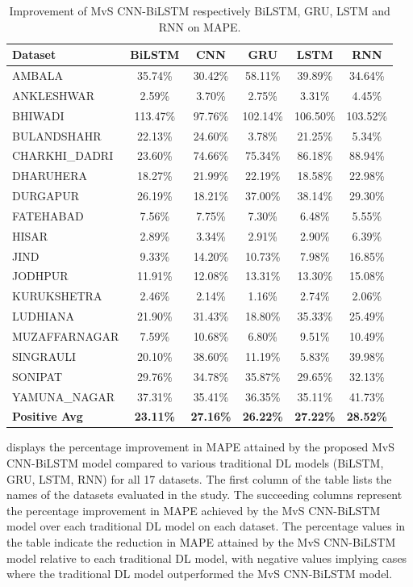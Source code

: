 \documentclass[a4paper, fleqn]{cas-sc}
\theoremstyle{definition}
\theoremstyle{remark}
\begin{document}
  \begin{table}[]
    \caption{ Improvement of MvS CNN-BiLSTM respectively BiLSTM,  GRU,  LSTM and RNN on MAPE.}
    \label{MAPE imp}
    \begin{tabular}{lccccc}
    \hline   Dataset       &   BiLSTM &CNN & GRU &   LSTM &   RNN  \\ \hline
    AMBALA & 35.74\% & 30.42\% & 58.11\% & 39.89\% & 34.64\% \\
    ANKLESHWAR & 2.59\% & 3.70\% & 2.75\% & 3.31\% & 4.45\% \\
    BHIWADI & 113.47\% & 97.76\% & 102.14\% & 106.50\% & 103.52\% \\
    BULANDSHAHR & 22.13\% & 24.60\% & 3.78\% & 21.25\% & 5.34\% \\
    CHARKHI\_DADRI & 23.60\% & 74.66\% & 75.34\% & 86.18\% & 88.94\% \\
    DHARUHERA & 18.27\% & 21.99\% & 22.19\% & 18.58\% & 22.98\% \\
    DURGAPUR & 26.19\% & 18.21\% & 37.00\% & 38.14\% & 29.30\% \\
    FATEHABAD & 7.56\% & 7.75\% & 7.30\% & 6.48\% & 5.55\% \\
    HISAR & 2.89\% & 3.34\% & 2.91\% & 2.90\% & 6.39\% \\
    JIND & 9.33\% & 14.20\% & 10.73\% & 7.98\% & 16.85\% \\
    JODHPUR & 11.91\% & 12.08\% & 13.31\% & 13.30\% & 15.08\% \\
    KURUKSHETRA & 2.46\% & 2.14\% & 1.16\% & 2.74\% & 2.06\% \\
    LUDHIANA & 21.90\% & 31.43\% & 18.80\% & 35.33\% & 25.49\% \\
    MUZAFFARNAGAR & 7.59\% & 10.68\% & 6.80\% & 9.51\% & 10.49\% \\
    SINGRAULI & 20.10\% & 38.60\% & 11.19\% & 5.83\% & 39.98\% \\
    SONIPAT & 29.76\% & 34.78\% & 35.87\% & 29.65\% & 32.13\% \\
    YAMUNA\_NAGAR & 37.31\% & 35.41\% & 36.35\% & 35.11\% & 41.73\% \\ \hline
    \textbf{Positive Avg} & \textbf{23.11\% }& \textbf{27.16\% }& \textbf{26.22\%} & \textbf{27.22\%} & \textbf{28.52\%} \\ \hline
    \end{tabular}
    \end{table}
     displays the percentage improvement in MAPE attained by the proposed MvS CNN-BiLSTM model compared to various traditional DL models (BiLSTM,  GRU,  LSTM,  RNN) for all 17 datasets. The first column of the table lists the names of the datasets evaluated in the study. The succeeding columns represent the percentage improvement in MAPE achieved by the MvS CNN-BiLSTM model over each traditional DL model on each dataset. The percentage values in the table indicate the reduction in MAPE attained by the MvS CNN-BiLSTM model relative to each traditional DL model,  with negative values implying cases where the traditional DL model outperformed the MvS CNN-BiLSTM model.
\end{document}
